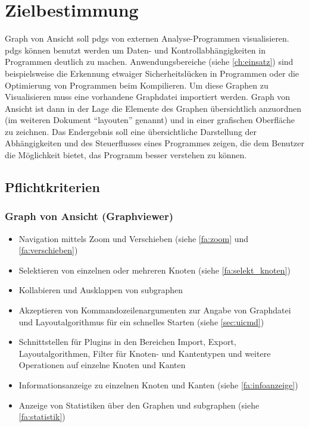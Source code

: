 \chapter{Zielbestimmung}
Graph von Ansicht soll \glspl{pdg} von externen Analyse-Programmen visualisieren.
\glspl{pdg} können benutzt werden um Daten- und Kontrollabhängigkeiten in Programmen deutlich zu machen.
Anwendungsbereiche (siehe \ref{ch:einsatz}) sind beispielsweise die Erkennung etwaiger Sicherheitslücken in Programmen oder die Optimierung von Programmen beim Kompilieren.
Um diese Graphen zu Visualisieren muss eine vorhandene Graphdatei importiert werden.
Graph von Ansicht ist dann in der Lage die Elemente des Graphen übersichtlich anzuordnen (im weiteren Dokument ``layouten'' genannt) und in einer grafischen Oberfläche zu zeichnen.
Das Endergebnis soll eine übersichtliche Darstellung der Abhängigkeiten und des Steuerflusses eines Programmes zeigen, die dem Benutzer die Möglichkeit bietet, das Programm besser verstehen zu können.\\


\section{Pflichtkriterien}

\subsection{Graph von Ansicht (Graphviewer)}
  \begin{itemize}
    \item Navigation mittels Zoom und Verschieben (siehe \ref{fa:zoom} und \ref{fa:verschieben})
    \item Selektieren von einzelnen oder mehreren Knoten (siehe \ref{fa:selekt_knoten})
    \item Kollabieren und Ausklappen von \gls{subgraph}en %
    \item Akzeptieren von Kommandozeilenargumenten zur Angabe von Graphdatei und Layoutalgorithmus für ein schnelles Starten (siehe \ref{sec:uicmd})
    \item Schnittstellen für Plugins in den Bereichen Import, Export, Layoutalgorithmen, Filter für Knoten- und Kantentypen und weitere Operationen auf einzelne Knoten und Kanten
    \item Informationsanzeige zu einzelnen Knoten und Kanten (siehe \ref{fa:infoanzeige})
    \item Anzeige von Statistiken über den Graphen und \gls{subgraph}en (siehe \ref{fa:statistik})
  \end{itemize}
  
